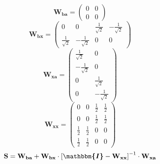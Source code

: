 \documentclass[10pt]{article} \usepackage{amsmath} \usepackage{bbold}
\begin{document}
\[ \mathbf{W_{ba}} = \left(\begin{smallmatrix} 0 & 0 \\ 0 & 0
\end{smallmatrix}\right) \]
\[ \mathbf{W_{bx}} = \left(\begin{smallmatrix} 0 & 0 &
\frac{1}{\sqrt{2}} & -\frac{1}{\sqrt{2}} \\ \frac{1}{\sqrt{2}} &
-\frac{1}{\sqrt{2}} & 0 & 0 \end{smallmatrix}\right) \]
\[ \mathbf{W_{xa}} = \left(\begin{smallmatrix} \frac{1}{\sqrt{2}} & 0
\\ -\frac{1}{\sqrt{2}} & 0 \\ 0 & \frac{1}{\sqrt{2}} \\ 0 &
-\frac{1}{\sqrt{2}} \end{smallmatrix}\right) \]
\[ \mathbf{W_{xx}} = \left(\begin{smallmatrix} 0 & 0 & \frac{1}{2} &
\frac{1}{2} \\ 0 & 0 & \frac{1}{2} & \frac{1}{2} \\ \frac{1}{2} &
\frac{1}{2} & 0 & 0 \\ \frac{1}{2} & \frac{1}{2} & 0 & 0
\end{smallmatrix}\right) \]
\[ \mathbf{S}=\mathbf{W_{ba}}+\mathbf{W_{bx}}\cdot\left[
\boldsymbol{\mathbbm{I}}
-\mathbf{W_{xx}}\right]^{-1}\cdot\mathbf{W_{xa}} \]
\end{document}
